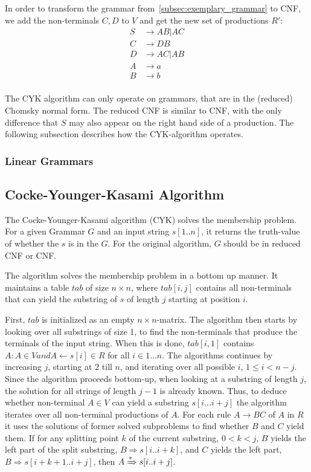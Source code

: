 In order to transform the grammar from~\ref{subsec:exemplary_grammar} to CNF, we add the non-terminals $C,D$ to $V$ and get the new set of productions $R'$:
\begin{align*}
    S&\rightarrow AB | AC \\
    C&\rightarrow DB \\
    D&\rightarrow AC|AB \\
    A&\rightarrow a \\
    B&\rightarrow b \\
\end{align*}

The CYK algorithm can only operate on grammars, that are in the (reduced) Chomsky normal form.
The reduced CNF is similar to CNF, with the only difference that $S$ may also appear on the right hand side of a production.
The following subsection describes how the CYK-algorithm operates.

\subsubsection{Linear Grammars}

\subsection{Cocke-Younger-Kasami Algorithm}

The Cocke-Younger-Kasami algorithm (CYK) solves the membership problem.
For a given Grammar $G$ and an input string $s[1..n]$, it returns the truth-value of whether the $s$ is in the $G$.
For the original algorithm, $G$ should be in reduced CNF or CNF.

The algorithm solves the membership problem in a bottom up manner.
It maintains a table $tab$ of size $n\times n$, where $tab[i,j]$ contains all non-terminals that can yield the substring of $s$ of length $j$ starting at position $i$.

First, $tab$ is initialized as an empty $n\times n$-matrix.
The algorithm then starts by looking over all substrings of size 1, to find the non-terminals that produce the terminals of the input string.
When this is done, $tab[i,1]$ contains ${A: A\in V and A\leftarrow s[i] \in R}$ for all $i\in {1\dots n}$.
The algorithms continues by increasing $j$, starting at $2$ till $n$, and iterating over all possible $i$, $1\leq i < n-j$.
Since the algorithm proceeds bottom-up, when looking at a substring of length $j$, the solution for all strings of length $j-1$ is already known.
Thus, to deduce whether non-terminal $A\in V$ can yield a substring $s[i...i+j]$ the algorithm iterates over all non-terminal productions of $A$.
For each rule $A\rightarrow BC$ of $A$ in $R$ it uses the solutions of former solved subproblems to find whether $B$ and $C$ yield them.
If for any splitting point $k$ of the current substring, $0 < k < j$, $B$ yields the left part of the split substring, $B\Rightarrow s[i..i+k]$, and $C$ yields the left part, $B\Rightarrow s[i+k+1..i+j]$, then $A\xRightarrow{*} s[i..i+j]$.

